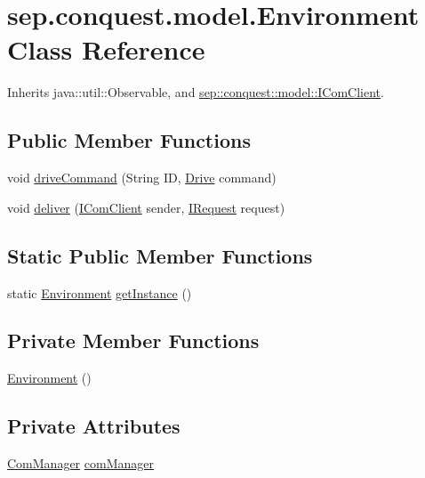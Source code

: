 \hypertarget{classsep_1_1conquest_1_1model_1_1_environment}{
\section{sep.conquest.model.Environment Class Reference}
\label{classsep_1_1conquest_1_1model_1_1_environment}
}


Inherits java::util::Observable, and \hyperlink{interfacesep_1_1conquest_1_1model_1_1_i_com_client}{sep::conquest::model::IComClient}.

\subsection*{Public Member Functions}
\begin{DoxyCompactItemize}
\item 
void \hyperlink{classsep_1_1conquest_1_1model_1_1_environment_a196a2ec08d888b9d89d50462b459e721}{driveCommand} (String ID, \hyperlink{namespacesep_1_1conquest_1_1model_ad9908b97350fd824462db2d10c17794c}{Drive} command)
\item 
void \hyperlink{classsep_1_1conquest_1_1model_1_1_environment_a880d910664e5f747ab13e0701a8d2699}{deliver} (\hyperlink{interfacesep_1_1conquest_1_1model_1_1_i_com_client}{IComClient} sender, \hyperlink{interfacesep_1_1conquest_1_1model_1_1_i_request}{IRequest} request)
\end{DoxyCompactItemize}
\subsection*{Static Public Member Functions}
\begin{DoxyCompactItemize}
\item 
static \hyperlink{classsep_1_1conquest_1_1model_1_1_environment}{Environment} \hyperlink{classsep_1_1conquest_1_1model_1_1_environment_ab9eeba684b473394230e527d3314fbc4}{getInstance} ()
\end{DoxyCompactItemize}
\subsection*{Private Member Functions}
\begin{DoxyCompactItemize}
\item 
\hyperlink{classsep_1_1conquest_1_1model_1_1_environment_a44bade3bd3cc84e40cc11bf21390ad9a}{Environment} ()
\end{DoxyCompactItemize}
\subsection*{Private Attributes}
\begin{DoxyCompactItemize}
\item 
\hyperlink{classsep_1_1conquest_1_1model_1_1_com_manager}{ComManager} \hyperlink{classsep_1_1conquest_1_1model_1_1_environment_a7c3a35500c1ef418d39862f73d3b90f8}{comManager}
\end{DoxyCompactItemize}

